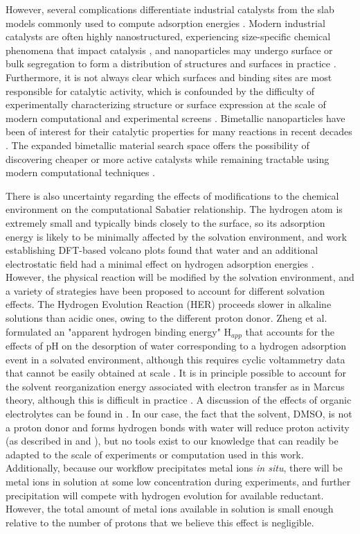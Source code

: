\documentclass[preprint,12pt]{elsarticle}
\begin{document}
 However, several complications differentiate industrial catalysts from the slab models commonly used to compute adsorption energies \cite{norskov2005trends,tran2018active}. Modern industrial catalysts are often highly nanostructured, experiencing size-specific chemical phenomena that impact catalysis \cite{khorshidi2018strain}, and nanoparticles may undergo surface or bulk segregation to form a distribution of structures and surfaces in practice \cite{mitchell2021nanoscale,vallee2001size}. Furthermore, it is not always clear which surfaces and binding sites are most responsible for catalytic activity, which is confounded by the difficulty of experimentally characterizing structure or surface expression at the scale of modern computational and experimental screens \cite{yang2022applications}. Bimetallic nanoparticles have been of interest for their catalytic properties for many reactions in recent decades \cite{toshima1998bimetallic,singh2013synergistic}. The expanded bimetallic material search space offers the possibility of discovering cheaper or more active catalysts while remaining tractable using modern computational techniques \cite{tran2018active}.

 There is also uncertainty regarding the effects of modifications to the chemical environment on the computational Sabatier relationship. The hydrogen atom is extremely small and typically binds closely to the surface, so its adsorption energy is likely to be minimally affected by the solvation environment, and work establishing DFT-based volcano plots found that water and an additional electrostatic field had a minimal effect on hydrogen adsorption energies \cite{norskov2004origin}. However, the physical reaction will be modified by the solvation environment, and a variety of strategies have been proposed to account for different solvation effects. The Hydrogen Evolution Reaction (HER) proceeds slower in alkaline solutions than acidic ones, owing to the different proton donor. Zheng et al. formulated an "apparent hydrogen binding energy" H$_{app}$ that accounts for the effects of pH on the desorption of water corresponding to a hydrogen adsorption event in a solvated environment, although this requires cyclic voltammetry data that cannot be easily obtained at scale \cite{zheng2018perspective}. It is in principle possible to account for the solvent reorganization energy associated with electron transfer as in Marcus theory, although this is difficult in practice \cite{santos2012theory}. A discussion of the effects of organic electrolytes can be found in \cite{dubouis2019hydrogen}. In our case, the fact that the solvent, DMSO, is not a proton donor and forms hydrogen bonds with water will reduce proton activity (as described in \cite{liu2017effects} and \cite{nian2021designing}), but no tools exist to our knowledge that can readily be adapted to the scale of experiments or computation used in this work. Additionally, because our workflow precipitates metal ions \emph{in situ}, there will be metal ions in solution at some low concentration during experiments, and further precipitation will compete with hydrogen evolution for available reductant. However, the total amount of metal ions available in solution is small enough relative to the number of protons that we believe this effect is negligible.
\end{document}
